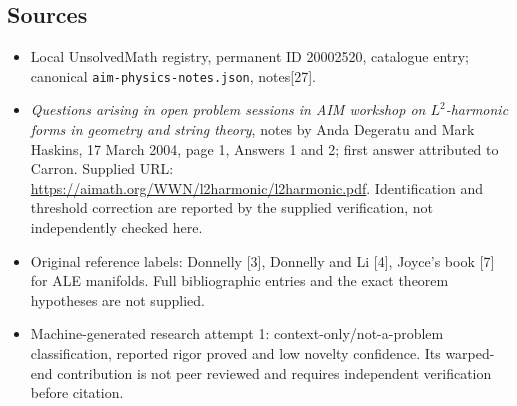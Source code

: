 \documentclass[11pt]{article}
\begin{document}
\subsection{Sources}
\begin{itemize}
\item Local UnsolvedMath registry, permanent ID 20002520, catalogue entry; canonical \texttt{aim-physics-notes.json}, notes[27].
\item \emph{Questions arising in open problem sessions in AIM workshop on \(L^2\)-harmonic forms in geometry and string theory}, notes by Anda Degeratu and Mark Haskins, 17 March 2004, page 1, Answers 1 and 2; first answer attributed to Carron. Supplied URL: \url{https://aimath.org/WWN/l2harmonic/l2harmonic.pdf}. Identification and threshold correction are reported by the supplied verification, not independently checked here.
\item Original reference labels: Donnelly [3], Donnelly and Li [4], Joyce's book [7] for ALE manifolds. Full bibliographic entries and the exact theorem hypotheses are not supplied.
\item Machine-generated research attempt 1: context-only/not-a-problem classification, reported rigor proved and low novelty confidence. Its warped-end contribution is not peer reviewed and requires independent verification before citation.
\end{itemize}
\end{document}
